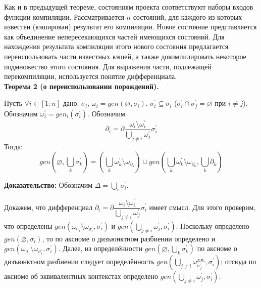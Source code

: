 Как и в предыдущей теореме, состояниям проекта соответствуют наборы входов функции компиляции. Рассматривается $n$ состояний, для каждого из которых известен (кэширован) результат его компиляции. Новое состояние представляется как объединение непересекающихся частей имеющихся состояний. Для нахождения результата компиляции этого нового состояния предлагается переиспользовать части известных кэшей, а также докомпилировать некоторое подмножество этого состояния. Для выражения части, подлежащей перекомпиляции, используется понятие дифференциала.\\

\textbf{Теорема 2 (о переиспользовании порождений).}

Пусть $\forall i \in [1:n]$ дано: $\sigma_i$, $\omega_i = gen(\varnothing, \sigma_i)$, $\sigma_i^\prime \subseteq \sigma_i$ ($\sigma_i^\prime \cap \sigma_j^\prime = \varnothing$ при $i \neq j$). Обозначим $\omega_i^\prime = gen_i(\sigma_i^\prime)$. Обозначим 
$$\partial_i = \partial\dfrac{\omega_i \setminus \omega_i^\prime}{\bigcup\limits_{j \neq i} \omega_j^\prime} \sigma_i^\prime$$
Тогда:
$$gen(\varnothing, \bigcup\limits_k \sigma^\prime_k) = \left( \bigcup\limits_k \omega_k^\prime \setminus \omega_{\partial_k} \right) \cup gen(\bigcup\limits_k \omega_k^\prime \setminus \omega_{\partial_k}, \bigcup\limits_k \partial_k)$$

\newcommand{\sigi}{{\sigma_i}}
\newcommand{\sigpi}{{\sigma^\prime_i}}
\newcommand{\sigpj}{{\sigma^\prime_j}}
\newcommand{\parti}{{\partial_i}}
\newcommand{\alloth}{\bigcup\limits_{j \neq i}\omega^\prime_j}
\newcommand{\rprt}{{\text{п.ч.}}}

\textbf{Доказательство:}
Обозначим $\Delta = \bigcup\limits_i \sigma_i^\prime$.

Докажем, что дифференциал $\partial_i = \partial\dfrac{\omega_i \setminus \omega_i^\prime}{\bigcup\limits_{j \neq i} \omega_j^\prime} \sigma_i^\prime$ имеет смысл. Для этого проверим, что определены $gen(\omega_{\sigi} \setminus \omega_{\sigpi}, \sigpi)$ и $gen(\alloth, \sigpi)$. Поскольку определено $gen(\varnothing, \sigi)$, то по аксиоме о дизъюнктном разбиении определено и $gen(\omega_{\sigi} \setminus \omega_{\sigpi}, \sigpi)$. Далее, из определённости $gen(\varnothing, \bigcup\limits_k \sigma^\prime_k)$ по аксиоме о дизъюнктном разбиении следует определённость $gen(\bigcup\limits_{j \neq i}\omega^{\text{л.ч.}}_\sigpj, \sigpi)$; отсюда по аксиоме об эквивалентных контекстах определено $gen(\alloth, \sigpi)$.

